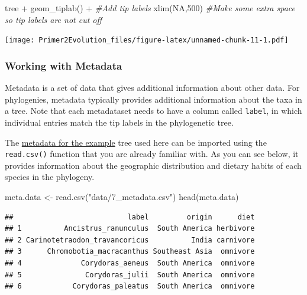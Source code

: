 \documentclass[
]{book}
\newenvironment{Shaded}{\begin{snugshade}}{\end{snugshade}}
\newcommand{\CommentTok}[1]{\textcolor[rgb]{0.56,0.35,0.01}{\textit{#1}}}
\newcommand{\ConstantTok}[1]{\textcolor[rgb]{0.00,0.00,0.00}{#1}}
\newcommand{\DecValTok}[1]{\textcolor[rgb]{0.00,0.00,0.81}{#1}}
\newcommand{\FunctionTok}[1]{\textcolor[rgb]{0.00,0.00,0.00}{#1}}
\newcommand{\NormalTok}[1]{#1}
\newcommand{\OtherTok}[1]{\textcolor[rgb]{0.56,0.35,0.01}{#1}}
\newcommand{\SpecialCharTok}[1]{\textcolor[rgb]{0.00,0.00,0.00}{#1}}
\newcommand{\StringTok}[1]{\textcolor[rgb]{0.31,0.60,0.02}{#1}}
\begin{document}
\begin{Shaded}
\begin{Highlighting}[]
\NormalTok{tree }\SpecialCharTok{+} 
  \FunctionTok{geom\_tiplab}\NormalTok{() }\SpecialCharTok{+} \CommentTok{\#Add tip labels}
  \FunctionTok{xlim}\NormalTok{(}\ConstantTok{NA}\NormalTok{,}\DecValTok{500}\NormalTok{) }\CommentTok{\#Make some extra space so tip labels are not cut off}
\end{Highlighting}
\end{Shaded}

\texttt{[image: Primer2Evolution\_files/figure-latex/unnamed-chunk-11-1.pdf]}

\hypertarget{working-with-metadata}{%
\subsubsection*{Working with Metadata}\label{working-with-metadata}}

Metadata is a set of data that gives additional information about other data. For phylogenies, metadata typically provides additional information about the taxa in a tree. Note that each metadataset needs to have a column called \texttt{label}, in which individual entries match the tip labels in the phylogenetic tree.

The \href{data/7_metadata.csv}{metadata for the example} tree used here can be imported using the \texttt{read.csv()} function that you are already familiar with. As you can see below, it provides information about the geographic distribution and dietary habits of each species in the phylogeny.

\begin{Shaded}
\begin{Highlighting}[]
\NormalTok{meta.data }\OtherTok{\textless{}{-}} \FunctionTok{read.csv}\NormalTok{(}\StringTok{"data/7\_metadata.csv"}\NormalTok{)}
\FunctionTok{head}\NormalTok{(meta.data)}
\end{Highlighting}
\end{Shaded}

\begin{verbatim}
##                           label         origin      diet
## 1          Ancistrus_ranunculus  South America herbivore
## 2 Carinotetraodon_travancoricus          India carnivore
## 3      Chromobotia_macracanthus Southeast Asia  omnivore
## 4              Corydoras_aeneus  South America  omnivore
## 5               Corydoras_julii  South America  omnivore
## 6            Corydoras_paleatus  South America  omnivore
\end{verbatim}
\end{document}
